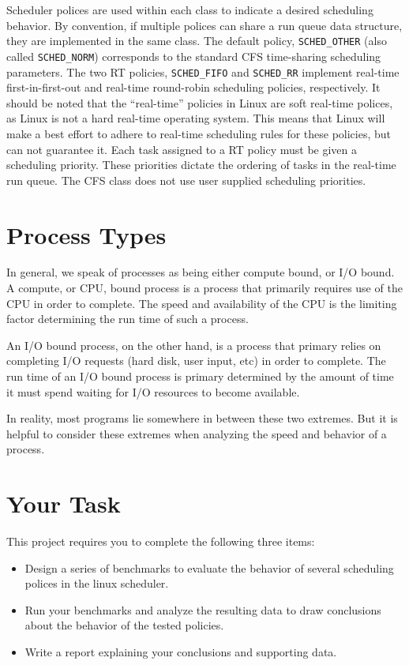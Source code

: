 \documentclass[12pt]{article}
\begin{document}
Scheduler polices are used within each class to indicate a desired
scheduling behavior. By convention, if multiple polices can share a run
queue data structure, they are implemented in the same class. The
default policy, \texttt{SCHED\_OTHER} (also called
\texttt{SCHED\_NORM}) corresponds to the standard CFS time-sharing
scheduling parameters. The two RT policies, \texttt{SCHED\_FIFO} and
\texttt{SCHED\_RR} implement real-time first-in-first-out and real-time
round-robin scheduling policies, respectively. It should be noted that
the ``real-time'' policies in Linux are soft real-time polices, as
Linux is not a hard real-time operating system. This means that Linux
will make a best effort to adhere to real-time scheduling rules for
these policies, but can not guarantee it. Each task assigned to a RT
policy must be given a scheduling priority. These priorities dictate the
ordering of tasks in the real-time run queue. The CFS class does not
use user supplied scheduling priorities.

\section{Process Types}

In general, we speak of processes as being either compute bound, or
I/O bound. A compute, or CPU, bound process is a process that primarily
requires use of the CPU in order to complete. The speed and availability
of the CPU is the limiting
factor determining the run time of such a process.

An I/O bound process, on the other hand, is a process that
primary relies on completing I/O requests (hard disk, user input, etc)
in order to complete. The run time of an I/O bound process is primary
determined by the amount of time it must spend waiting for I/O
resources to become available.

In reality, most programs lie somewhere in between these two
extremes. But it is helpful to consider these extremes when analyzing
the speed and behavior of a process.

\section{Your Task}

This project requires you to complete the following three items:

\begin{itemize}
\item Design a series of benchmarks to evaluate the behavior of
  several scheduling polices in the linux scheduler.
\item Run your benchmarks and analyze the resulting data to draw
  conclusions about the behavior of the tested policies. 
\item Write a report explaining your conclusions and supporting data.
\end{itemize}
\end{document}
